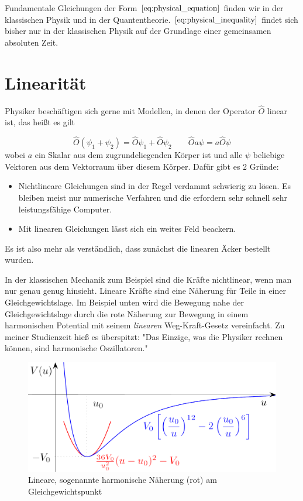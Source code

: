 \documentclass[12pt]{book}
\begin{document}
Fundamentale Gleichungen der Form $\eqref{eq:physical_equation}$ finden wir in der klassischen Physik und in der Quantentheorie. $\eqref{eq:physical_inequality}$ findet sich bisher nur in der klassischen Physik auf der Grundlage einer gemeinsamen absoluten Zeit.

\section{Linearität}

Physiker beschäftigen sich gerne mit Modellen, in denen der Operator $\hat{O}$ linear ist, das heißt es gilt

\begin{equation} 
\hat{O}(\psi_1 + \psi_2) = \hat{O}\psi_1 + \hat{O}\psi_2 \quad\quad \hat{O}a\psi = a\hat{O}\psi 
\label{eq:linearity}
\end{equation}
wobei $a$ ein Skalar aus dem zugrundeliegenden Körper ist und alle $\psi$ beliebige Vektoren aus dem Vektorraum über diesem Körper. Dafür gibt es 2 Gründe:
\begin{itemize}
\item Nichtlineare Gleichungen sind in der Regel verdammt schwierig zu lösen. Es bleiben meist nur numerische Verfahren und die erfordern sehr schnell sehr leistungsfähige Computer.
\item Mit linearen Gleichungen lässt sich ein weites Feld beackern.
\end{itemize}
Es ist also mehr als verständlich, dass zunächst die linearen Äcker bestellt wurden. 

In der klassischen Mechanik zum Beispiel sind die Kräfte nichtlinear, wenn man nur genau genug hinsieht. Lineare Kräfte sind eine Näherung für Teile in einer Gleichgewichtslage. Im Beispiel unten wird die Bewegung nahe der Gleichgewichtslage durch die rote Näherung zur Bewegung in einem harmonischen Potential mit seinem \emph{linearen} Weg-Kraft-Gesetz vereinfacht. Zu meiner Studienzeit hieß es überspitzt: "Das Einzige, was die Physiker rechnen können, sind harmonische Oszillatoren."

\begin{figure}[!h]\begin{center}
  \includegraphics[width=13cm]{Bilder/Harmonische_Naeherung.png}
  \caption{Lineare, sogenannte harmonische Näherung (rot) am Gleichgewichtspunkt}
  \label{fig:harmonic_approximation}
\end{center}\end{figure}
\end{document}
